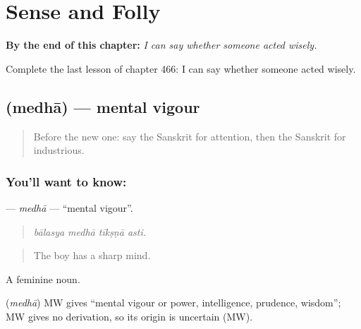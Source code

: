 
\chapter{Sense and Folly}
\label{ch:sa-sense-and-folly}

\begin{chapteropening}
\textbf{By the end of this chapter:} \emph{I can say whether someone acted wisely.}

Complete the last lesson of chapter 466: I can say whether someone acted wisely.
\end{chapteropening}

\section[\texorpdfstring{\sk{मेधा} (medhā)}{मेधा (medhā)}]{ (medhā) — mental vigour}

\label{lesson:SA-C466-medha}



\begin{quote}
Before the new one: say the Sanskrit for attention, then the Sanskrit for industrious.
\end{quote}

\subsection*{You'll want to know: }
\textbf{} — \emph{medhā} — \textquotedblleft{}mental vigour\textquotedblright{}.

\begin{quote}
   
\end{quote}

\begin{quote}
\emph{bālasya medhā tīkṣṇā asti.}
\end{quote}

\begin{quote}
The boy has a sharp mind.
\end{quote}

A feminine noun.

\begin{cousinweb}
\textbf{} (\emph{medhā}) MW gives \textquotedblleft{}mental vigour or power, intelligence, prudence, wisdom\textquotedblright{}; MW gives no derivation, so its origin is uncertain (MW).
\end{cousinweb}

